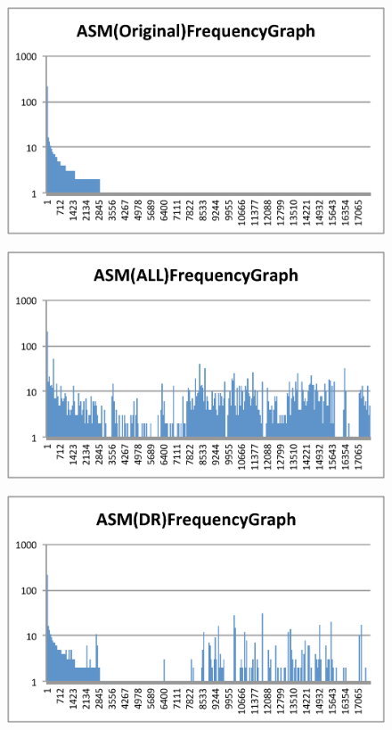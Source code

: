 \documentclass[conference]{IEEEtran}
\begin{document}
\begin{figure}[bt]
  \centering
  \begin{minipage}[b]{0.48\linewidth}
    \includegraphics[clip,width=1.0\columnwidth]{images/ORI}%
    \label{fig:asm-5gram-original-histogram}%
  \end{minipage}
  \begin{minipage}[b]{0.48\linewidth}
    \includegraphics[clip,width=1.0\columnwidth]{images/ALL}%
    \label{fig:asm-5gram-ALL-histogram}%
  \end{minipage}
  \begin{minipage}[b]{0.48\linewidth}
    \includegraphics[clip,width=1.0\columnwidth]{images/DR}%

\end{minipage}
\end{figure}
\end{document}
